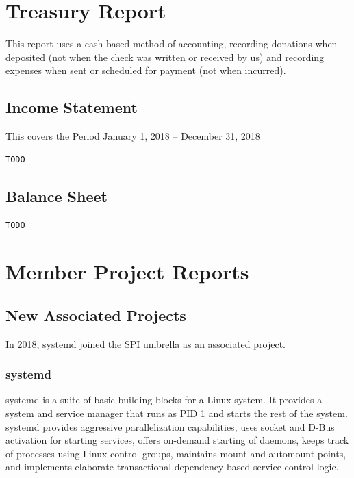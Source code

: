 \documentclass[a4paper]{report}
\begin{document}
\chapter{Treasury Report}

This report uses a cash-based method of accounting, recording donations
when deposited (not when the check was written or received by us) and
recording expenses when sent or scheduled for payment (not when
incurred).

\section{Income Statement}

This covers the Period January 1, 2018 -- December 31, 2018

\begin{verbatim}
TODO
\end{verbatim}

\section{Balance Sheet}

\begin{verbatim}
TODO
\end{verbatim}

\chapter{Member Project Reports}

\section{New Associated Projects}

In 2018, systemd joined the SPI umbrella as an associated project.

\subsection{systemd}

systemd is a suite of basic building blocks for a Linux system. It
provides a system and service manager that runs as PID 1 and starts the
rest of the system. systemd provides aggressive parallelization
capabilities, uses socket and D-Bus activation for starting services,
offers on-demand starting of daemons, keeps track of processes using
Linux control groups, maintains mount and automount points, and
implements elaborate transactional dependency-based service control logic.
\end{document}
